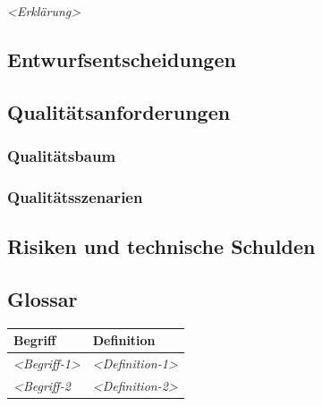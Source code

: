 \emph{\textless{}Erklärung\textgreater{}}

\subsection{Entwurfsentscheidungen}\label{section-design-decisions}

\subsection{Qualitätsanforderungen}\label{section-quality-scenarios}

\subsubsection{Qualitätsbaum}\label{_qualit_tsbaum}

\subsubsection{Qualitätsszenarien}\label{_qualit_tsszenarien}

\subsection{Risiken und technische Schulden}\label{section-technical-risks}

\subsection{Glossar}\label{section-glossary}

\begin{longtable}[]{@{}ll@{}}
\toprule
\begin{minipage}[b]{0.31\columnwidth}\raggedright\strut
Begriff\strut
\end{minipage} & \begin{minipage}[b]{0.63\columnwidth}\raggedright\strut
Definition\strut
\end{minipage}\tabularnewline
\midrule
\endhead
\begin{minipage}[t]{0.31\columnwidth}\raggedright\strut
\emph{\textless{}Begriff-1\textgreater{}}\strut
\end{minipage} & \begin{minipage}[t]{0.63\columnwidth}\raggedright\strut
\emph{\textless{}Definition-1\textgreater{}}\strut
\end{minipage}\tabularnewline
\begin{minipage}[t]{0.31\columnwidth}\raggedright\strut
\emph{\textless{}Begriff-2}\strut
\end{minipage} & \begin{minipage}[t]{0.63\columnwidth}\raggedright\strut
\emph{\textless{}Definition-2\textgreater{}}\strut
\end{minipage}\tabularnewline
\bottomrule
\end{longtable}
